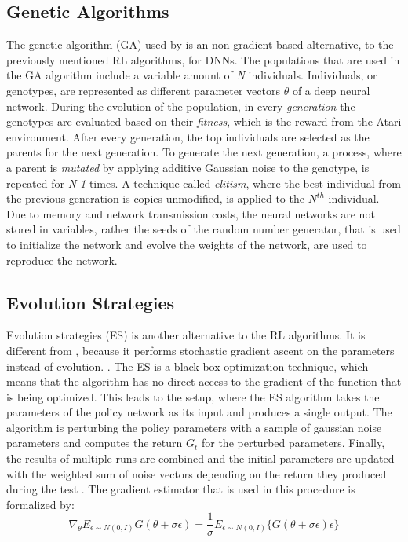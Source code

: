 \subsection[head={GA}, tocentry={Genetic Algorithms}, reference={GA}]{Genetic Algorithms} \label{ssec:ga}
The genetic algorithm (GA) used by \cite{2017arXiv171206567P} is an non-gradient-based alternative, to the previously mentioned RL algorithms, for DNNs. The populations that are used in the GA algorithm include a variable amount of \textit{N} individuals. Individuals, or genotypes, are represented as different parameter vectors \(\theta\) of a deep neural network. During the evolution of the population, in every \textit{generation} the genotypes are evaluated based on their \textit{fitness}, which is the reward from the Atari environment. After every generation, the top individuals are selected as the parents for the next generation. To generate the next generation, a process, where a parent is \textit{mutated} by applying additive Gaussian noise to the genotype, is repeated for \textit{N-1} times. A technique called \textit{elitism}, where the best individual from the previous generation is copies unmodified, is applied to the \(N^{th}\) individual. Due to memory and network transmission costs, the neural networks are not stored in variables, rather the seeds of the random number generator, that is used to initialize the network and evolve the weights of the network, are used to reproduce the network.

\subsection[head={ES}, tocentry={Evolution Strategies}, reference={ES}]{Evolution Strategies} \label{ssec:es}
Evolution strategies (ES) is another alternative to the RL algorithms. It is different from , because it performs stochastic gradient ascent on the parameters instead of evolution. \cite{2017arXiv171206567P}. The ES is a black box optimization technique, which means that the algorithm has no direct access to the gradient of the function that is being optimized. This leads to the setup, where the ES algorithm takes the parameters of the policy network as its input and produces a single output. The algorithm is perturbing the policy parameters with a sample of gaussian noise parameters and computes the return \(G_{t}\) for the perturbed parameters. Finally, the results of multiple runs are combined and the initial parameters are updated with the weighted sum of noise vectors depending on the return they produced during the test \cite{2017arXiv170303864S}. The gradient estimator that is used in this procedure is formalized by:
\begin{equation}
\nabla_{\theta}E_{\epsilon\sim N(0,I)}G(\theta+\sigma\epsilon)=\frac{1}{\sigma}E_{\epsilon\sim N(0,I)}\{G(\theta+\sigma\epsilon)\epsilon\}
\label{eq:esalgo}
\end{equation}

